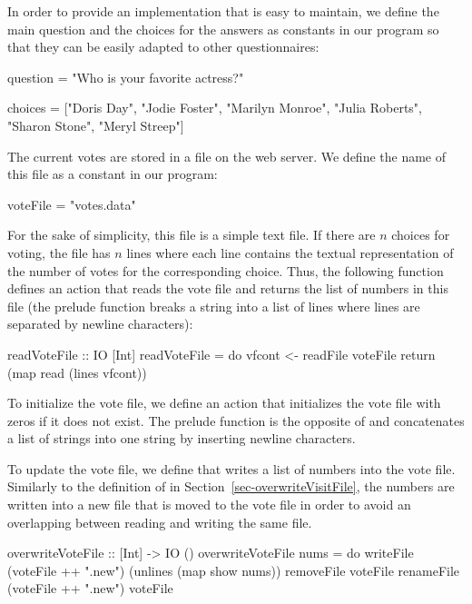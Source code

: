 In order to provide an implementation that is easy to maintain,
we define the main question and the choices for the answers
as constants in our program so that they can be easily adapted
to other questionnaires:
\begin{curry}
question = "Who is your favorite actress?"

choices = ["Doris Day", "Jodie Foster", "Marilyn Monroe",
           "Julia Roberts", "Sharon Stone", "Meryl Streep"]
\end{curry}
%
The current votes are stored in a file on the web server.
We define the name of this file as a constant in our program:
%
\begin{curry}
voteFile = "votes.data"
\end{curry}
%
For the sake of simplicity, this file is a simple text file.
If there are $n$ choices for voting, the file has $n$ lines
where each line contains the textual representation of the
number of votes for the corresponding choice.
Thus, the following function defines an action that reads
the vote file and returns the list of numbers in this file
(the prelude function  breaks
a string into a list of lines where lines are separated by newline
characters):
%
\begin{curry}
readVoteFile :: IO [Int]
readVoteFile = do
  vfcont <- readFile voteFile
  return (map read (lines vfcont))
\end{curry}
%
To initialize the vote file, we define an action 
that initializes the vote file with  zeros if it does not exist.
The prelude function 
is the opposite of  and concatenates a list of strings
into one string by inserting newline characters.
%
%
To update the vote file, we define 
that writes a list of
numbers into the vote file. Similarly to the definition of
 in Section~\ref{sec-overwriteVisitFile},
the numbers are written into a new file that is moved to the vote file
in order to avoid an overlapping between reading and writing the same file.
%
\begin{curry}
overwriteVoteFile :: [Int] -> IO ()
overwriteVoteFile nums = do
  writeFile (voteFile ++ ".new") (unlines (map show nums))
  removeFile voteFile
  renameFile (voteFile ++ ".new") voteFile
\end{curry}
